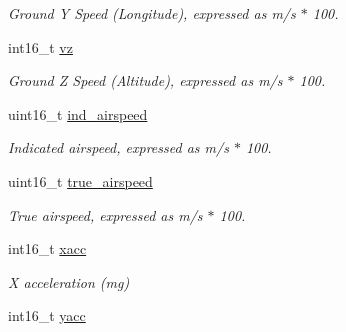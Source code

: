 \begin{DoxyCompactItemize}
\begin{DoxyCompactList}\small\item\em Ground Y Speed (Longitude), expressed as m/s $\ast$ 100. \end{DoxyCompactList}\item 
\hypertarget{struct____mavlink__hil__state__quaternion__t_a40093764fa265d7443ce5d6215bc6cfa}{int16\+\_\+t \hyperlink{struct____mavlink__hil__state__quaternion__t_a40093764fa265d7443ce5d6215bc6cfa}{vz}}\label{struct____mavlink__hil__state__quaternion__t_a40093764fa265d7443ce5d6215bc6cfa}

\begin{DoxyCompactList}\small\item\em Ground Z Speed (Altitude), expressed as m/s $\ast$ 100. \end{DoxyCompactList}\item 
\hypertarget{struct____mavlink__hil__state__quaternion__t_a78c835fba2a49d66fd73d745d347fac5}{uint16\+\_\+t \hyperlink{struct____mavlink__hil__state__quaternion__t_a78c835fba2a49d66fd73d745d347fac5}{ind\+\_\+airspeed}}\label{struct____mavlink__hil__state__quaternion__t_a78c835fba2a49d66fd73d745d347fac5}

\begin{DoxyCompactList}\small\item\em Indicated airspeed, expressed as m/s $\ast$ 100. \end{DoxyCompactList}\item 
\hypertarget{struct____mavlink__hil__state__quaternion__t_ac644e31d08eeed05f5f3b7eacdd18f4b}{uint16\+\_\+t \hyperlink{struct____mavlink__hil__state__quaternion__t_ac644e31d08eeed05f5f3b7eacdd18f4b}{true\+\_\+airspeed}}\label{struct____mavlink__hil__state__quaternion__t_ac644e31d08eeed05f5f3b7eacdd18f4b}

\begin{DoxyCompactList}\small\item\em True airspeed, expressed as m/s $\ast$ 100. \end{DoxyCompactList}\item 
\hypertarget{struct____mavlink__hil__state__quaternion__t_a72af144dbb58ba6cd5a474206a88420f}{int16\+\_\+t \hyperlink{struct____mavlink__hil__state__quaternion__t_a72af144dbb58ba6cd5a474206a88420f}{xacc}}\label{struct____mavlink__hil__state__quaternion__t_a72af144dbb58ba6cd5a474206a88420f}

\begin{DoxyCompactList}\small\item\em X acceleration (mg) \end{DoxyCompactList}\item 
\hypertarget{struct____mavlink__hil__state__quaternion__t_a949a82c6d368468354dd201cda5458fa}{int16\+\_\+t \hyperlink{struct____mavlink__hil__state__quaternion__t_a949a82c6d368468354dd201cda5458fa}{yacc}}\label{struct____mavlink__hil__state__quaternion__t_a949a82c6d368468354dd201cda5458fa}


\end{DoxyCompactItemize}
